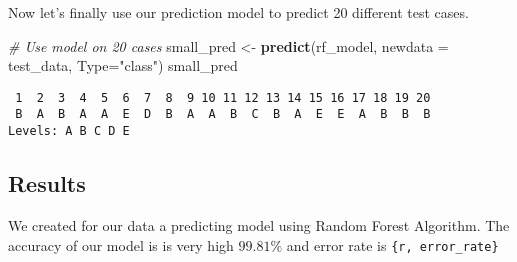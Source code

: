 \documentclass[
  10pt,
  a4paper]{article}
\newenvironment{Shaded}{\begin{snugshade}}{\end{snugshade}}
\newcommand{\CommentTok}[1]{\textcolor[rgb]{0.56,0.35,0.01}{\textit{#1}}}
\newcommand{\DataTypeTok}[1]{\textcolor[rgb]{0.13,0.29,0.53}{#1}}
\newcommand{\KeywordTok}[1]{\textcolor[rgb]{0.13,0.29,0.53}{\textbf{#1}}}
\newcommand{\NormalTok}[1]{#1}
\newcommand{\StringTok}[1]{\textcolor[rgb]{0.31,0.60,0.02}{#1}}
\begin{document}
Now let's finally use our prediction model to predict 20 different test
cases.

\begin{Shaded}
\begin{Highlighting}[]
\CommentTok{# Use model on 20 cases}
\NormalTok{small_pred <-}\StringTok{ }\KeywordTok{predict}\NormalTok{(rf_model, }\DataTypeTok{newdata =}\NormalTok{ test_data, }\DataTypeTok{Type=}\StringTok{"class"}\NormalTok{)}
\NormalTok{small_pred}
\end{Highlighting}
\end{Shaded}

\begin{verbatim}
 1  2  3  4  5  6  7  8  9 10 11 12 13 14 15 16 17 18 19 20 
 B  A  B  A  A  E  D  B  A  A  B  C  B  A  E  E  A  B  B  B 
Levels: A B C D E
\end{verbatim}

\hypertarget{results}{%
\subsection{Results}\label{results}}

We created for our data a predicting model using Random Forest
Algorithm. The accuracy of our model is is very high \(99.81 \%\) and
error rate is \texttt{\{r,\ error\_rate\}}
\end{document}
